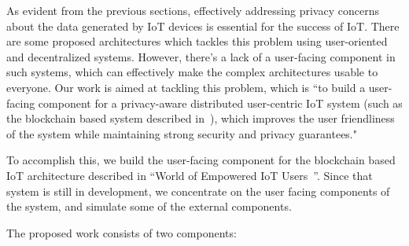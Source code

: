 As evident from the previous sections, effectively addressing privacy concerns about the data generated by IoT devices is essential for the success of IoT. There are some proposed architectures which tackles this problem using user-oriented and decentralized systems. However, there's a lack of a user-facing component in such systems, which can effectively make the complex architectures usable to everyone. Our work is aimed at tackling this problem, which is ``to build a user-facing component for a privacy-aware distributed user-centric IoT system (such as the blockchain based system described in~\cite{campbell}), which improves the user friendliness of the system while maintaining strong security and privacy guarantees."

To accomplish this, we build the user-facing component for the blockchain based IoT architecture described in ``World of Empowered IoT Users~\cite{campbell}''. Since that system is still in development, we concentrate on the user facing components of the system, and simulate some of the external components.

The proposed work consists of two components:

